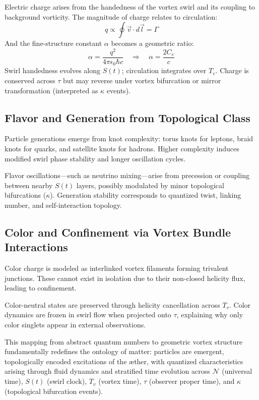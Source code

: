 \documentclass[12pt]{article}
\begin{document}
Electric charge arises from the handedness of the vortex swirl and its coupling to background vorticity. The magnitude of charge relates to circulation:
\begin{equation}
q \propto \oint \vec{v} \cdot d\vec{l} = \Gamma
\end{equation}
And the fine-structure constant $\alpha$ becomes a geometric ratio:
\begin{equation}
\alpha = \frac{q^2}{4\pi \epsilon_0 \hbar c} \quad \Rightarrow \quad \alpha = \frac{2C_e}{c}
\end{equation}
Swirl handedness evolves along $S(t)$; circulation integrates over $T_v$. Charge is conserved across $\tau$ but may reverse under vortex bifurcation or mirror transformation (interpreted as $\kappa$ events).

\subsection{Flavor and Generation from Topological Class}

Particle generations emerge from knot complexity: torus knots for leptons, braid knots for quarks, and satellite knots for hadrons. Higher complexity induces modified swirl phase stability and longer oscillation cycles.

Flavor oscillations---such as neutrino mixing---arise from precession or coupling between nearby $S(t)$ layers, possibly modulated by minor topological bifurcations ($\kappa$). Generation stability corresponds to quantized twist, linking number, and self-interaction topology.

\subsection{Color and Confinement via Vortex Bundle Interactions}

Color charge is modeled as interlinked vortex filaments forming trivalent junctions. These cannot exist in isolation due to their non-closed helicity flux, leading to confinement.

Color-neutral states are preserved through helicity cancellation across $T_v$. Color dynamics are frozen in swirl flow when projected onto $\tau$, explaining why only color singlets appear in external observations.

\bigskip

This mapping from abstract quantum numbers to geometric vortex structure fundamentally redefines the ontology of matter: particles are emergent, topologically encoded excitations of the \ae{}ther, with quantized characteristics arising through fluid dynamics and stratified time evolution across $\mathcal{N}$ (universal time), $S(t)$ (swirl clock), $T_v$ (vortex time), $\tau$ (observer proper time), and $\kappa$ (topological bifurcation events).
\end{document}
